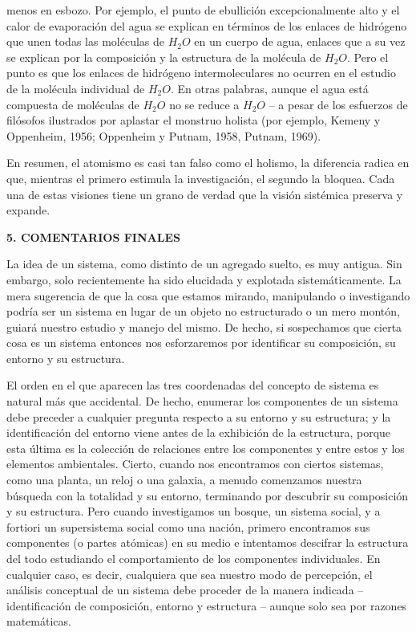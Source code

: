 {\fontsize{13}{15}\selectfont
menos en esbozo. Por ejemplo, el punto de ebullición excepcionalmente alto y el calor de evaporación del 
agua se explican en términos de los enlaces de hidrógeno que unen todas las moléculas de \( H_2O \) en un cuerpo de agua, 
enlaces que a su vez se explican por la composición y la estructura de la molécula de \( H_2O \). Pero el punto es que los enlaces de 
hidrógeno intermoleculares no ocurren en el estudio de la molécula individual de \( H_2O \). En otras palabras, 
aunque el agua está compuesta de moléculas de \( H_2O \) no se reduce a \( H_2O \) – a pesar de los esfuerzos de filósofos ilustrados por aplastar el monstruo holista 
(por ejemplo, Kemeny y Oppenheim, 1956; Oppenheim y Putnam, 1958, Putnam, 1969).

En resumen, el atomismo es casi tan falso como el holismo, la diferencia radica en que, 
mientras el primero estimula la investigación, el segundo la bloquea. Cada una de estas visiones tiene un grano de verdad que la visión sistémica preserva y expande.

\vspace{0.5cm}
\begin{center}
{\fontsize{15}{17}\selectfont \textbf{5. COMENTARIOS FINALES}}
\end{center}
\vspace{0.5cm}

La idea de un sistema, como distinto de un agregado suelto, es muy antigua. Sin embargo, solo recientemente ha sido elucidada y explotada sistemáticamente. 
La mera sugerencia de que la cosa que estamos mirando, manipulando o investigando podría ser un sistema en lugar de un objeto no estructurado o un mero montón, 
guiará nuestro estudio y manejo del mismo. De hecho, si sospechamos que cierta cosa es un sistema entonces nos esforzaremos por identificar su composición, su entorno y su estructura.

El orden en el que aparecen las tres coordenadas del concepto de sistema es natural más que accidental. De hecho, enumerar los componentes de un sistema debe preceder 
a cualquier pregunta respecto a su entorno y su estructura; y la identificación del entorno viene antes de la exhibición de la estructura, 
porque esta última es la colección de relaciones entre los componentes y entre estos y los elementos ambientales. Cierto, cuando nos encontramos con ciertos sistemas, 
como una planta, un reloj o una galaxia, a menudo comenzamos nuestra búsqueda con la totalidad y su entorno, terminando por descubrir su composición y su estructura. 
Pero cuando investigamos un bosque, un sistema social, y a fortiori un supersistema social como una nación, primero encontramos sus componentes (o partes atómicas) en su medio e intentamos descifrar 
la estructura del todo estudiando el comportamiento de los componentes individuales. En cualquier caso, es decir, cualquiera que sea nuestro modo de percepción, 
el análisis conceptual de un sistema debe proceder de la manera indicada – identificación de composición, entorno y estructura – aunque solo sea por razones matemáticas.
}

